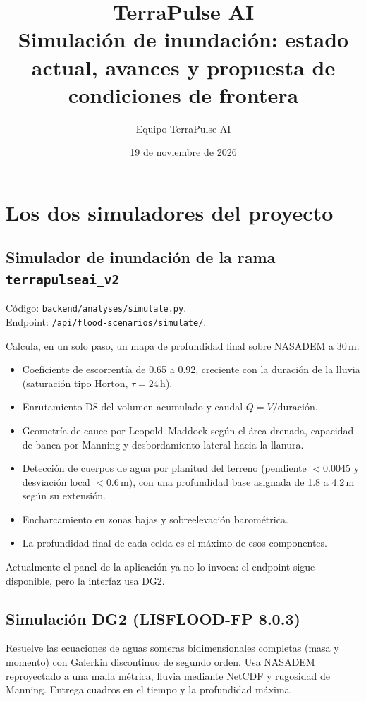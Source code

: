 \documentclass[11pt,a4paper]{article}
\title{\textbf{TerraPulse AI}\\[6pt]\Large Simulación de inundación: estado actual, avances y propuesta de condiciones de frontera}
\author{Equipo TerraPulse AI}
\date{19 de noviembre de 2026}
\begin{document}
\maketitle

\section{Los dos simuladores del proyecto}

\subsection*{Simulador de inundación de la rama \texttt{terrapulseai\_v2}}

Código: \nolinkurl{backend/analyses/simulate.py}.\\
Endpoint: \nolinkurl{/api/flood-scenarios/simulate/}.

Calcula, en un solo paso, un mapa de profundidad final sobre NASADEM a 30\,m:

\begin{itemize}
  \item Coeficiente de escorrentía de 0.65 a 0.92, creciente con la duración de la lluvia (saturación tipo Horton, $\tau = 24$\,h).
  \item Enrutamiento D8 del volumen acumulado y caudal $Q = V/\text{duración}$.
  \item Geometría de cauce por Leopold--Maddock según el área drenada, capacidad de banca por Manning y desbordamiento lateral hacia la llanura.
  \item Detección de cuerpos de agua por planitud del terreno (pendiente $< 0.0045$ y desviación local $< 0.6$\,m), con una profundidad base asignada de 1.8 a 4.2\,m según su extensión.
  \item Encharcamiento en zonas bajas y sobreelevación barométrica.
  \item La profundidad final de cada celda es el máximo de esos componentes.
\end{itemize}

Actualmente el panel de la aplicación ya no lo invoca: el endpoint sigue disponible, pero la interfaz usa DG2.

\subsection*{Simulación DG2 (LISFLOOD-FP 8.0.3)}

Resuelve las ecuaciones de aguas someras bidimensionales completas (masa y momento) con Galerkin discontinuo de segundo orden. Usa NASADEM reproyectado a una malla métrica, lluvia mediante NetCDF y rugosidad de Manning. Entrega cuadros en el tiempo y la profundidad máxima.
\end{document}
